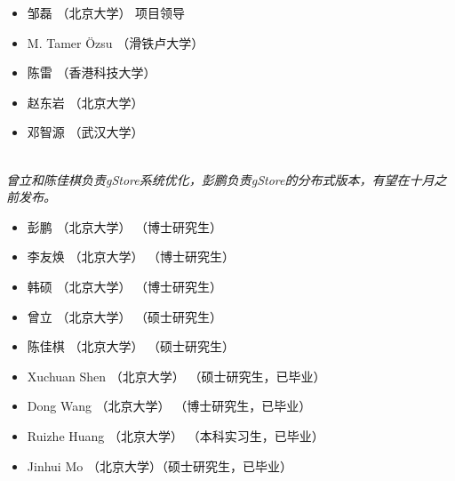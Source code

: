 \documentclass[titlepage, a4paper, 12pt]{article}
\begin{document}

\begin{itemize}
	\item
	邹磊 （北京大学） 项目领导
	\item
	M. Tamer {\"O}zsu （滑铁卢大学）
	\item
	陈雷 （香港科技大学）
	\item
	赵东岩 （北京大学）
	\item 
	邓智源 （武汉大学）
\end{itemize}


\quad \\

\textit{曾立和陈佳棋负责gStore系统优化，彭鹏负责gStore的分布式版本，有望在十月之前发布。}

\begin{itemize}
	\item
	彭鹏 （北京大学） （博士研究生）
	\item
	李友焕 （北京大学） （博士研究生）
	\item
	韩硕 （北京大学） （博士研究生）
	\item
	曾立 （北京大学） （硕士研究生）
	\item
	陈佳棋 （北京大学） （硕士研究生）
\end{itemize}


\begin{itemize}
	\item
	Xuchuan Shen （北京大学） （硕士研究生，已毕业）
	\item
	Dong Wang （北京大学） （博士研究生，已毕业）
	\item
	Ruizhe Huang （北京大学） （本科实习生，已毕业）
	\item
	Jinhui Mo （北京大学）（硕士研究生，已毕业）
\end{itemize}

\clearpage
\end{document}
